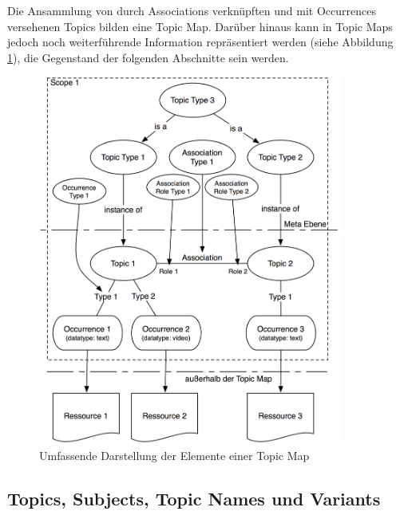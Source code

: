 Die Ansammlung von durch Associations verknüpften und mit Occurrences versehenen Topics bilden eine Topic Map. Darüber hinaus kann in Topic Maps jedoch noch weiterführende Information repräsentiert werden (siehe Abbildung \ref{fig:img_Persistenz_TMFull}), die Gegenstand der folgenden Abschnitte sein werden.

\begin{figure}[htbp]
	\centering
		\includegraphics[width=10cm]{img/Persistenz/TMFull.png}
	\caption{Umfassende Darstellung der Elemente einer Topic Map}
	\label{fig:img_Persistenz_TMFull}
\end{figure}

\subsection{Topics, Subjects, Topic Names und Variants} %
\label{sub:topics_subjects_topic_names_und_variants}

